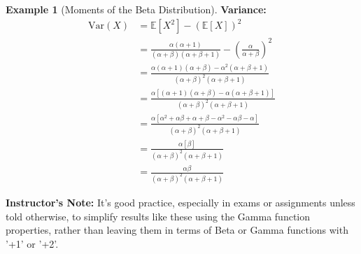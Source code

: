 \documentclass[11pt, letterpaper]{article}
\theoremstyle{plain} %
\theoremstyle{definition} %
\newtheorem{example}[theorem]{Example}
\theoremstyle{remark} %
\newenvironment{instructorcomment}
  {\par\medskip\noindent\begin{framed}\textbf{Instructor's Note:} \normalfont}
  {\end{framed}\medskip}
\newcommand{\E}{\mathbb{E}}
\newcommand{\Var}{\mathrm{Var}}
\begin{document}
\begin{example}[Moments of the Beta Distribution]
\textbf{Variance:}
\begin{align*} \Var(X) &= \E[X^2] - (\E[X])^2 \\ &= \frac{\alpha(\alpha+1)}{(\alpha+\beta)(\alpha+\beta+1)} - \left(\frac{\alpha}{\alpha+\beta}\right)^2 \\ &= \frac{\alpha(\alpha+1)(\alpha+\beta) - \alpha^2(\alpha+\beta+1)}{(\alpha+\beta)^2(\alpha+\beta+1)} \\ &= \frac{\alpha[(\alpha+1)(\alpha+\beta) - \alpha(\alpha+\beta+1)]}{(\alpha+\beta)^2(\alpha+\beta+1)} \\ &= \frac{\alpha[\alpha^2+\alpha\beta+\alpha+\beta - \alpha^2-\alpha\beta-\alpha]}{(\alpha+\beta)^2(\alpha+\beta+1)} \\ &= \frac{\alpha[\beta]}{(\alpha+\beta)^2(\alpha+\beta+1)} \\ &= \frac{\alpha\beta}{(\alpha+\beta)^2(\alpha+\beta+1)} \end{align*}

\begin{instructorcomment}
It's good practice, especially in exams or assignments unless told otherwise, to simplify results like these using the Gamma function properties, rather than leaving them in terms of Beta or Gamma functions with '+1' or '+2'.
\end{instructorcomment}
\end{example}
\end{document}
